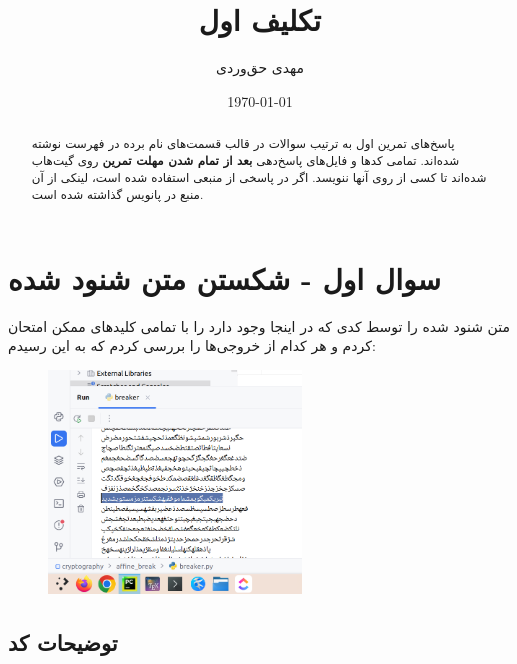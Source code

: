 \documentclass{article}
\title{تکلیف اول}
\author{مهدی حق‌وردی}
\date{\today}
\begin{document}
\maketitle
\tableofcontents

\begin{abstract}
پاسخ‌های تمرین اول به ترتیب سوالات در قالب قسمت‌‌‌‌های نام برده در فهرست نوشته شده‌اند. تمامی کد‌ها و فایل‌های پاسخ‌دهی \textbf{بعد از تمام شدن مهلت تمرین} روی گیت‌هاب  شده‌اند تا کسی از روی ‌آنها ننویسد. اگر در پاسخی از منبعی استفاده شده است، لینکی از آن منبع در پانویس گذاشته شده است.
\end{abstract}
\newpage
\section{سوال اول - شکستن متن شنود شده}
متن شنود شده را توسط کدی که در اینجا
وجود دارد را با تمامی کلید‌‌های ممکن امتحان کردم و هر کدام از خروجی‌ها را بررسی کردم که به این رسیدم:
\begin{figure}[H]
\begin{center}
\includegraphics[width=0.6\textwidth, height=0.4\textheight]{images/found}
\end{center}
\end{figure}

\subsection{توضیحات کد}
\end{document}
